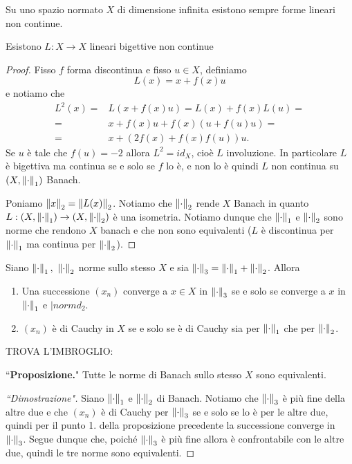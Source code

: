 \begin{exercise}
Su uno spazio normato $X$ di dimensione infinita esistono sempre forme lineari non continue. 
\end{exercise}

\begin{remark}
Esistono $L:X\to X$ lineari bigettive non continue
\end{remark}
\begin{proof}
Fisso $f$ forma discontinua e fisso $u\in X$, definiamo
\[L(x)=x+f(x)u\]
e notiamo che
\begin{align*}
L^2(x)=&L(x+f(x)u)=L(x)+f(x)L(u)=\\
=&x+f(x)u +f(x)(u+f(u)u)=\\
=&x+(2f(x)+f(x)f(u))u.
\end{align*}
Se $u$ \`e tale che $f(u)=-2$ allora $L^2=id_X$, cio\`e $L$ involuzione. In particolare $L$ \`e bigettiva ma continua se e solo se $f$ lo \`e, e non lo \`e quindi $L$ non continua su $(X,\left\Vert{\cdot}\right\Vert_1)$ Banach.

Poniamo $\left\Vert{x}\right\Vert_2=\left\Vert{L(x)}\right\Vert_2$. Notiamo che $\left\Vert{\cdot}\right\Vert_2$ rende $X$ Banach in quanto $L:(X,\left\Vert{\cdot}\right\Vert_1)\to (X,\left\Vert{\cdot}\right\Vert_2)$ \`e una isometria. Notiamo dunque che $\left\Vert{\cdot}\right\Vert_1$ e $\left\Vert{\cdot}\right\Vert_2$ sono norme che rendono $X$ banach e che non sono equivalenti ($L$ \`e discontinua per $\left\Vert{\cdot}\right\Vert_1$ ma continua per $\left\Vert{\cdot}\right\Vert_2$).
\end{proof}

\begin{exercise}
Siano $\left\Vert{\cdot}\right\Vert_1,\ \left\Vert{\cdot}\right\Vert_2$ norme sullo stesso $X$ e sia $\left\Vert{\cdot}\right\Vert_3=\left\Vert{\cdot}\right\Vert_1+\left\Vert{\cdot}\right\Vert_2$. Allora
\begin{enumerate}
    \item Una successione $(x_n)$ converge a $x\in X$ in $\left\Vert{\cdot}\right\Vert_3$ se e solo se converge a $x$ in $\left\Vert{\cdot}\right\Vert_1$ e $|normd_2$.
    \item $(x_n)$ \`e di Cauchy in $X$ se e solo se \`e di Cauchy sia per $\left\Vert{\cdot}\right\Vert_1$ che per $\left\Vert{\cdot}\right\Vert_2$.
\end{enumerate}
\end{exercise}

\begin{exercise}
TROVA L'IMBROGLIO:

\noindent
``\textbf{Proposizione.}" Tutte le norme di Banach sullo stesso $X$ sono equivalenti.
\begin{proof}[``Dimostrazione"]
    Siano $\left\Vert{\cdot}\right\Vert_1$ e $\left\Vert{\cdot}\right\Vert_2$ di Banach. Notiamo che $\left\Vert{\cdot}\right\Vert_3$ \`e pi\`u fine della altre due e che $(x_n)$ \`e di Cauchy per $\left\Vert{\cdot}\right\Vert_3$ se e solo se lo \`e per le altre due, quindi per il punto 1. della proposizione precedente la successione converge in $\left\Vert{\cdot}\right\Vert_3$. Segue dunque che, poich\'e $\left\Vert{\cdot}\right\Vert_3$ \`e pi\`u fine allora \`e confrontabile con le altre due, quindi le tre norme sono equivalenti.
\end{proof}
\end{exercise}



